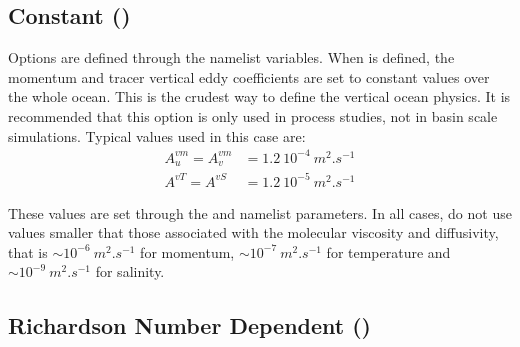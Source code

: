 \subsection{Constant ()}
\label{ZDF_cst}

Options are defined through the   namelist variables.
When  is defined, the momentum and tracer vertical eddy coefficients 
are set to constant values over the whole ocean. This is the crudest way to define 
the vertical ocean physics. It is recommended that this option is only used in 
process studies, not in basin scale simulations. Typical values used in this case are:
\begin{align*} 
A_u^{vm} = A_v^{vm} &= 1.2\ 10^{-4}~m^2.s^{-1} 	\\
A^{vT} = A^{vS} &= 1.2\ 10^{-5}~m^2.s^{-1}
\end{align*}

These values are set through the  and  namelist parameters. 
In all cases, do not use values smaller that those associated with the molecular 
viscosity and diffusivity, that is $\sim10^{-6}~m^2.s^{-1}$ for momentum, 
$\sim10^{-7}~m^2.s^{-1}$ for temperature and $\sim10^{-9}~m^2.s^{-1}$ for salinity.


\subsection{Richardson Number Dependent ()}
\label{ZDF_ric}


